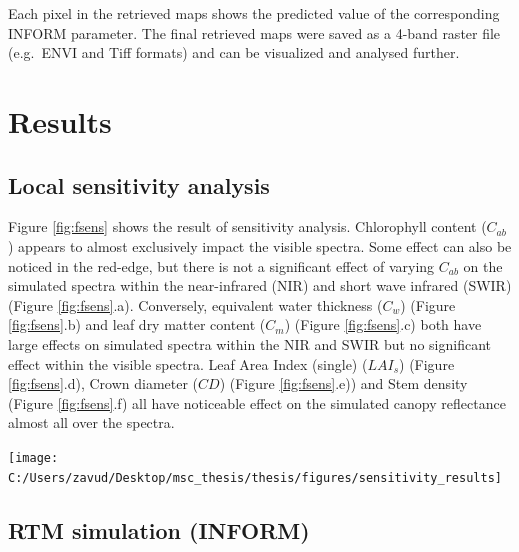 \documentclass[a4paper, twoside]{templates/ociamthesis}
\let\origfigure\figure
\let\endorigfigure\endfigure
\renewenvironment{figure}[1][2] {
    \expandafter\origfigure\expandafter[H]
} {
    \endorigfigure
}
\begin{document}
Each pixel in the retrieved maps shows the predicted value of the corresponding INFORM parameter. The final retrieved maps were saved as a 4-band raster file (e.g.~ENVI and Tiff formats) and can be visualized and analysed further.

\hypertarget{results}{%
\chapter{Results}\label{results}}

\hypertarget{local-sensitivity-analysis-1}{%
\section{Local sensitivity analysis}\label{local-sensitivity-analysis-1}}

Figure \ref{fig:fsens} shows the result of sensitivity analysis. Chlorophyll content (\(C_{ab}\)) appears to almost exclusively impact the visible spectra. Some effect can also be noticed in the red-edge, but there is not a significant effect of varying \(C_{ab}\) on the simulated spectra within the near-infrared (NIR) and short wave infrared (SWIR) (Figure \ref{fig:fsens}.a). Conversely, equivalent water thickness (\(C_{w}\)) (Figure \ref{fig:fsens}.b) and leaf dry matter content (\(C_{m}\)) (Figure \ref{fig:fsens}.c) both have large effects on simulated spectra within the NIR and SWIR but no significant effect within the visible spectra. Leaf Area Index (single) (\(LAI_{s}\)) (Figure \ref{fig:fsens}.d), Crown diameter (\(CD\)) (Figure \ref{fig:fsens}.e)) and Stem density (Figure \ref{fig:fsens}.f) all have noticeable effect on the simulated canopy reflectance almost all over the spectra.

\newpage

\begin{figure}

{\centering \texttt{[image: C:/Users/zavud/Desktop/msc\_thesis/thesis/figures/sensitivity\_results]} 

}

\caption{Effects of varying the chosen parameters on the simulated spectra}\label{fig:fsens}
\end{figure}

\newpage

\hypertarget{rtm-simulation-inform-1}{%
\section{RTM simulation (INFORM)}\label{rtm-simulation-inform-1}}
\end{document}
